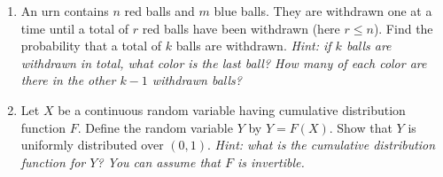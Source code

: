 \documentclass[12pt]{article}
\begin{document}
\begin{enumerate}
	\item An urn contains $n$ red balls and $m$ blue balls. They are withdrawn one at a time until a total of $r$ red balls have been withdrawn (here $r\leq n$). Find the probability that a total of $k$ balls are withdrawn.
	\textit{Hint: if $k$ balls are withdrawn in total, what color is the last ball? How many of each color are there in the other $k-1$ withdrawn balls?}
	\vfill

	\item Let $X$ be a continuous random variable having cumulative distribution function $F$. Define the random variable $Y$ by $Y = F(X)$. Show that $Y$ is uniformly distributed over $(0,1)$.
	\textit{Hint: what is the cumulative distribution function for $Y$? You can assume that $F$ is invertible.}

	\vfill\null
\end{enumerate}
\end{document}
